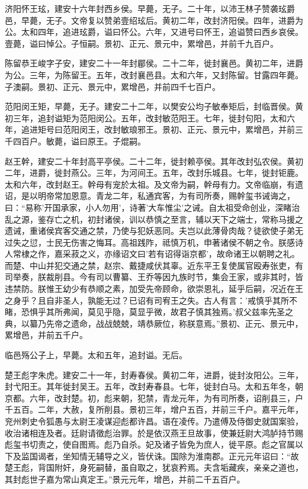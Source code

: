 \documentclass[12pt,UTF8]{ctexbook}
\begin{document}
济阳怀王玹，建安十六年封西乡侯。早薨，无子。二十年，以沛王林子赞袭玹爵邑，早薨，无子。文帝复以赞弟壹绍玹后。黄初二年，改封济阳侯。四年，进爵为公。太和四年，追进玹爵，谥曰怀公。六年，又进号曰怀王，追谥赞曰西乡哀侯。壹薨，谥曰悼公。子恒嗣。景初、正元、景元中，累增邑，并前千九百户。

陈留恭王峻字子安，建安二十一年封郿侯。二十二年，徙封襄邑。黄初二年，进爵为公。三年，为陈留王。五年，改封襄邑县。太和六年，又封陈留。甘露四年薨。子澳嗣。景初、正元、景元中，累增邑，并前四千七百户。

范阳闵王矩，早薨，无子。建安二十二年，以樊安公均子敏奉矩后，封临晋侯。黄初三年，追封谥矩为范阳闵公。五年，改封敏范阳王。七年，徙封句阳，太和六年，追进矩号曰范阳闵王，改封敏琅邪王。景初、正元、景元中，累增邑，并前三千四百户。敏薨，谥曰原王。子焜嗣。

赵王幹，建安二十年封高平亭侯。二十二年，徙封赖亭侯。其年改封弘农侯。黄初二年，进爵，徙封燕公。三年，为河间王。五年，改封乐城县。七年，徙封钜鹿。太和六年，改封赵王。幹母有宠於太祖。及文帝为嗣，幹母有力。文帝临崩，有遗诏，是以明帝常加恩意。青龙二年，私通宾客，为有司所奏，赐幹玺书诫诲之，曰：“易称'开国承家，小人勿用'，诗著'大车惟尘'之诫。自太祖受命创业，深睹治乱之源，鉴存亡之机，初封诸侯，训以恭慎之至言，辅以天下之端士，常称马援之遗诫，重诸侯宾客交通之禁，乃使与犯妖恶同。夫岂以此薄骨肉哉？徒欲使子弟无过失之愆，士民无伤害之悔耳。高祖践阼，祗慎万机，申著诸侯不朝之令。朕感诗人常棣之作，嘉采菽之义，亦缘诏文曰'若有诏得诣京都'，故命诸王以朝聘之礼。而楚、中山并犯交通之禁，赵宗、戴捷咸伏其辜。近东平王复使属官殴寿张吏，有司举奏，朕裁削县。今有司以曹纂、王乔等因九族时节，集会王家，或非其时，皆违禁防。朕惟王幼少有恭顺之素，加受先帝顾命，欲崇恩礼，延乎后嗣，况近在王之身乎？且自非圣人，孰能无过？已诏有司宥王之失。古人有言：'戒慎乎其所不睹，恐惧乎其所弗闻，莫见乎隐，莫显乎微，故君子慎其独焉。'叔父兹率先圣之典，以纂乃先帝之遗命，战战兢兢，靖恭厥位，称朕意焉。”景初、正元、景元中，累增邑，并前五千户。

临邑殇公子上，早薨。太和五年，追封谥。无后。

楚王彪字朱虎。建安二十一年，封寿春侯。黄初二年，进爵，徙封汝阳公。三年，封弋阳王。其年徙封吴王。五年，改封寿春县。七年，徙封白马。太和五年冬，朝京都。六年，改封楚。初，彪来朝，犯禁，青龙元年，为有司所奏，诏削县三，户千五百。二年，大赦，复所削县。景初三年，增户五百，并前三千户。嘉平元年，兖州刺史令狐愚与太尉王凌谋迎彪都许昌。语在凌传。乃遣傅及侍御史就国案验，收治诸相连及者。廷尉请徵彪治罪。於是依汉燕王旦故事，使兼廷尉大鸿胪持节赐彪玺书切责之，使自图焉。彪乃自杀。妃及诸子皆免为庶人，徙平原。彪之官属以下及监国谒者，坐知情无辅导之义，皆伏诛。国除为淮南郡。正元元年诏曰：“故楚王彪，背国附奸，身死嗣替，虽自取之，犹哀矜焉。夫含垢藏疾，亲亲之道也，其封彪世子嘉为常山真定王。”景元元年，增邑，并前二千五百户。
\end{document}
